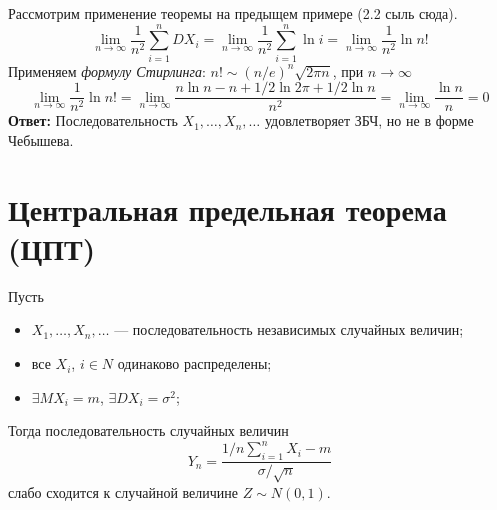 \begin{slv} Рассмотрим применение теоремы на предыщем примере (2.2 сыль сюда).
	\[
		\lim\limits_{n \to \infty} \frac{1}{n^2} \sum_{i = 1}^{n} DX_i = \lim\limits_{n \to \infty} \frac{1}{n^2} \sum_{i = 1}^{n} \ln i = \lim\limits_{n \to \infty} \frac{1}{n^2} \ln n!
	\]
	Применяем \textit{формулу Стирлинга}: $n! \sim (n/e)^n \sqrt{2 \pi n}$, при $n \to \infty$
	\[
		\lim\limits_{n \to \infty} \frac{1}{n^2} \ln n! = \lim\limits_{n \to \infty} \frac{n \ln n - n + 1/2 \ln 2 \pi + 1/2 \ln n}{n^2} = \lim\limits_{n \to \infty} \frac{\ln n}{n} = 0
	\]
	\textbf{Ответ:} Последовательность $X_1, \dots, X_n, \dots$ удовлетворяет ЗБЧ, но не в форме Чебышева.
\end{slv}



\section{Центральная предельная теорема (ЦПТ)}

\begin{thm} Пусть
	\begin{itemize}
		\item $X_1, \dots, X_n, \dots$ --- последовательность независимых случайных величин;
		\item все $X_i$, $i \in N$ одинаково распределены;
		\item $\exists MX_i = m$, $\exists DX_i = \sigma^2$;
	\end{itemize}
	Тогда последовательность случайных величин
	\[
		Y_n = \frac{1/n \sum_{i = 1}^{n} X_i - m}{\sigma/\sqrt{n}}
	\]
	слабо сходится к случайной величине $Z \sim N(0, 1)$.
\end{thm}

